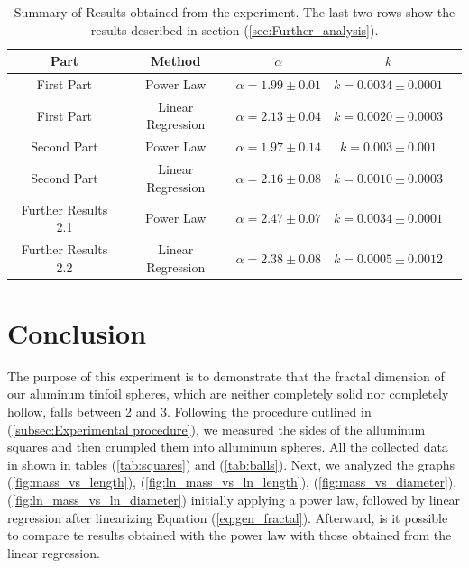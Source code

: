 \documentclass[a4paper,12pt]{article}
\begin{document}
\begin{table}[h!]
    \centering
    \caption{Summary of Results obtained from the experiment. The last two rows show the results described in section (\ref{sec:Further_analysis}).}
    \label{tab:summary_results}
    \begin{tabular}{|c|c|c|c|c|}
    \hline
    \textbf{Part} & \textbf{Method} & \textbf{$\alpha$} & \textbf{$k$}  \\ \hline
    First Part & Power Law & $\alpha = 1.99 \pm 0.01$ & $k = 0.0034 \pm 0.0001$  \\ \hline
    First Part & Linear Regression & $\alpha = 2.13 \pm 0.04$ & $k = 0.0020 \pm 0.0003$  \\ \hline
    Second Part & Power Law & $\alpha = 1.97 \pm 0.14$ & $k = 0.003 \pm 0.001$ \\ \hline
    Second Part & Linear Regression & $\alpha = 2.16 \pm 0.08$ & $k = 0.0010 \pm 0.0003$  \\ \hline
    Further Results 2.1 & Power Law & $\alpha = 2.47 \pm 0.07$ & $k = 0.0034 \pm 0.0001$ \\ \hline
    Further Results 2.2 & Linear Regression & $\alpha = 2.38 \pm 0.08$ & $k = 0.0005 \pm 0.0012$ \\ \hline
    \end{tabular}
    \end{table}
 




\section{Conclusion}\label{sec:conclusion}
The purpose of this experiment is to demonstrate that the fractal dimension of our aluminum tinfoil spheres, 
which are neither completely solid nor completely hollow, falls between 2 and 3.
Following the procedure outlined in (\ref{subsec:Experimental procedure}),
we measured the sides of the alluminum squares and then crumpled them into alluminum spheres.
All the collected data in shown in tables (\ref{tab:squares}) and (\ref{tab:balls}). 
Next, we analyzed the graphs (\ref{fig:mass_vs_length}), (\ref{fig:ln_mass_vs_ln_length}), (\ref{fig:mass_vs_diameter}), (\ref{fig:ln_mass_vs_ln_diameter}) 
initially applying a power law, followed by linear regression after linearizing Equation (\ref{eq:gen_fractal}).
Afterward, is it possible to compare te results obtained with the power law with those obtained from the linear regression.


\newpage
\printbibliography
\end{document}
